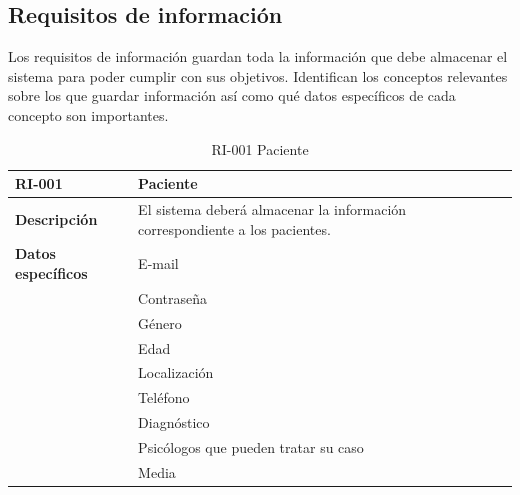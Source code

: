 \subsection{Requisitos de información}


Los requisitos de información guardan toda la información que debe almacenar el sistema para poder cumplir con sus objetivos. Identifican los conceptos relevantes sobre los que guardar información así como qué datos específicos de cada concepto son importantes.


\begin{table}[htpb]
\centering
\begin{tabularx}{\textwidth}{|l|X|}
\hline
\textbf{RI-001}            & \textbf{Paciente}                                                                       \\ \hline
\textbf{Descripción}       & El sistema deberá almacenar la información correspondiente a los pacientes.    \\ \hline
\textbf{Datos específicos} & E-mail                                                                         \\ 
\multirow{8}{*}{} & Contraseña                                                                     \\ 
                  & Género                                                                         \\ 
                  & Edad                                                                           \\ 
                  & Localización                                                                   \\ 
                  & Teléfono                                                                       \\  
                  & Diagnóstico                                                                    \\  
                  & Psicólogos que pueden tratar su caso \\ \hline
\textbf{Estabilidad}       & Media                                                                          \\ \hline
\end{tabularx}
\caption{RI-001 Paciente}
\end{table}



